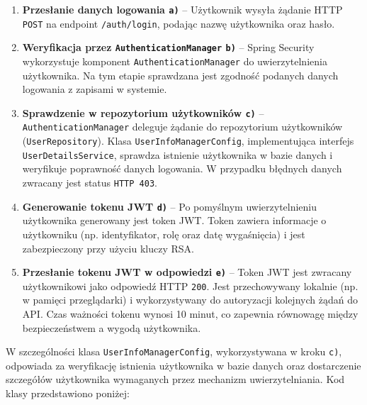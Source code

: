 \begin{enumerate}
    \item \textbf{Przesłanie danych logowania \texttt{a)}} -- Użytkownik wysyła żądanie HTTP \texttt{POST} na endpoint \texttt{/auth/login}, podając nazwę użytkownika oraz hasło. 

    \item \textbf{Weryfikacja przez \texttt{AuthenticationManager} \texttt{b)}} -- Spring Security wykorzystuje komponent \texttt{AuthenticationManager} do uwierzytelnienia użytkownika. Na tym etapie sprawdzana jest zgodność podanych danych logowania z zapisami w systemie.

    \item \textbf{Sprawdzenie w repozytorium użytkowników \texttt{c)}} -- \texttt{AuthenticationManager} deleguje żądanie do repozytorium użytkowników (\texttt{UserRepository}). Klasa \texttt{UserInfoManagerConfig}, implementująca interfejs \texttt{UserDetailsService}, sprawdza istnienie użytkownika w bazie danych i weryfikuje poprawność danych logowania. W przypadku błędnych danych zwracany jest status \texttt{HTTP 403}.

    \item \textbf{Generowanie tokenu JWT \texttt{d)}} -- Po pomyślnym uwierzytelnieniu użytkownika generowany jest token JWT. Token zawiera informacje o użytkowniku (np. identyfikator, rolę oraz datę wygaśnięcia) i jest zabezpieczony przy użyciu kluczy RSA.

    \item \textbf{Przesłanie tokenu JWT w odpowiedzi \texttt{e)}} -- Token JWT jest zwracany użytkownikowi jako odpowiedź HTTP \texttt{200}. Jest przechowywany lokalnie (np. w pamięci przeglądarki) i wykorzystywany do autoryzacji kolejnych żądań do API. Czas ważności tokenu wynosi 10 minut, co zapewnia równowagę między bezpieczeństwem a wygodą użytkownika.
\end{enumerate}

W szczególności klasa \texttt{UserInfoManagerConfig}, wykorzystywana w kroku \texttt{c)}, odpowiada za weryfikację istnienia użytkownika w bazie danych oraz dostarczenie szczegółów użytkownika wymaganych przez mechanizm uwierzytelniania. Kod klasy przedstawiono poniżej:

